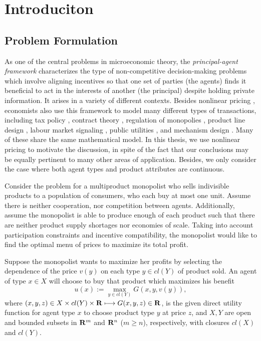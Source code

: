 \chapter{Introduciton}\label{chapter: introduction}

\section{Problem Formulation}

As one of the central problems in microeconomic theory, the {\em principal-agent framework} characterizes the type of non-competitive decision-making problems which involve aligning incentives so that one set of parties (the agents) finds it beneficial to act in the interests of another (the principal) despite holding private information.
It arises in a variety of different contexts. 
{ Besides nonlinear pricing \cite{Armstrong96,MussaRosen78,Spence80,Wilson93}, economists also use this framework to model many different types of transactions, including tax policy \cite{GuesnerieLaffont78,Mirrlees71,Rochet85}, contract theory \cite{QuinziiRochet85}, regulation of monopolies \cite{BaronMyerson82}, product line design \cite{RochetChone98}, labour market signaling \cite{Spence74}, public utilities \cite{Roberts79}, and mechanism design \cite{
KadanRenySwinkels11, MaskinRiley84, McAfeeMcMillan88, MonteiroPage98, Myerson81, Vohra11}. Many of these share the same mathematical model. }
In this thesis, we use nonlinear pricing to motivate the discussion,  in spite of the fact that our conclusions may be equally pertinent to many other areas of application. Besides, we only consider the case where both agent types and product attributes are continuous.\medskip

Consider the problem for a multiproduct monopolist who sells indivisible products to a population of consumers, who each buy at most one unit. Assume there is neither cooperation, nor competition between agents. Additionally, assume the monopolist is able to produce enough of each product such that there are neither product supply shortages {nor economies of scale}. Taking into account participation constraints and incentive compatibility, the monopolist would like to find the optimal menu of prices to maximize its total profit.\medskip

Suppose the monopolist wants to maximize her profits by selecting the dependence of the price $v(y)$ on each type  $y \in cl(Y)$ of product sold. An agent of type $x \in X$ will choose to buy that product which maximizes his benefit 
\begin{equation}\label{1}
u (x) := \max_{y \in cl(Y)} G(x, y, v(y)),
\end{equation}
where $(x, y, z)\in X \times cl(Y)\times {\mathbf R} \longmapsto G(x,y,z) \in {\mathbf R}$, is the given direct utility function for agent type $x$ to choose product type $y$ at price $z$, and $X,Y$ are open and bounded subsets in ${\mathbf R}^m$ and ${\mathbf R}^n$ ($m \ge n$), respectively,
with closures $cl(X)$ and $cl(Y)$.\medskip

